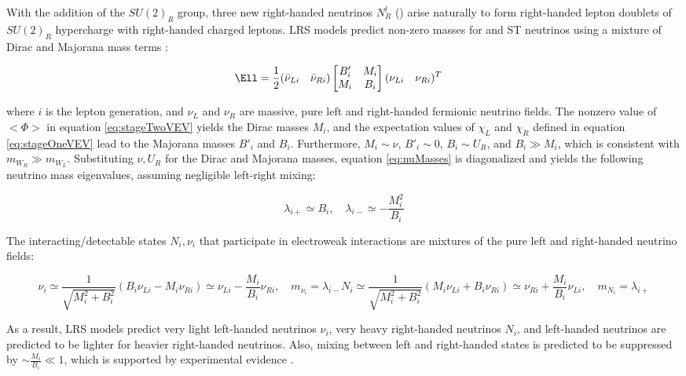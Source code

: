 With the addition of the $SU(2)_{R}$ group, three new right-handed neutrinos $N^{l}_{R}$ (\nul) arise naturally 
to form right-handed lepton doublets of $SU(2)_{R}$ hypercharge with right-handed charged leptons.  LRS models 
predict non-zero masses for \nul and ST neutrinos using a mixture of Dirac and Majorana mass terms \cite{seeSawAndParityViolation,seeSawAndGUTs}:

\begin{align}
	\Ell &= \frac{1}{2}(\bar{\nu}_{Li} \quad \bar{\nu}_{Ri})\begin{bmatrix}
	B'_{i} & M_{i} \\
	M_{i} & B_{i}
\end{bmatrix}(\nu_{Li} \quad \nu_{Ri})^{T}
\label{eq:nuMasses}
\end{align}

where $i$ is the lepton generation, and $\nu_{L}$ and $\nu_{R}$ are massive, pure left and right-handed 
fermionic neutrino fields.  The nonzero value of $<\Phi>$ in equation \ref{eq:stageTwoVEV} yields the 
Dirac masses $M_{i}$, and the expectation values of $\chi_{L}$ and $\chi_{R}$ defined in equation \ref{eq:stageOneVEV} 
lead to the Majorana masses $B'_{i}$ and $B_{i}$.  Furthermore, $M_{i} \sim \nu$, $B'_{i} \sim 0$, 
$B_{i} \sim U_{R}$, and $B_{i} \gg M_{i}$, which is consistent with $m_{W_{R}} \gg m_{W_{L}}$.  Substituting 
$\nu,U_{R}$ for the Dirac and Majorana masses, equation \ref{eq:nuMasses} is diagonalized and yields 
the following neutrino mass eigenvalues, assuming negligible left-right mixing:

\begin{equation}
	\lambda_{i+} \simeq B_{i},  \quad \lambda_{i-} \simeq -\frac{M^{2}_{i}}{B_{i}}
\end{equation}

The interacting/detectable states $N_{i}, \nu_{i}$ that participate in electroweak interactions are 
mixtures of the pure left and right-handed neutrino fields:

\begin{equation}
	\nu_{i} \simeq \frac{1}{\sqrt{M^{2}_{i} + B^{2}_{i}}}(B_{i}\nu_{Li} - M_{i}\nu_{Ri}) \simeq \nu_{Li} - \frac{M_{i}}{B_{i}}\nu_{Ri} , \quad m_{\nu_{i}} = \lambda_{i-}
	
	N_{i} \simeq \frac{1}{\sqrt{M^{2}_{i} + B^{2}_{i}}}(M_{i}\nu_{Li} + B_{i}\nu_{Ri}) \simeq \nu_{Ri} + \frac{M_{i}}{B_{i}}\nu_{Li} , \quad m_{N_{i}} = \lambda_{i+}
\end{equation}

As a result, LRS models predict very light left-handed neutrinos $\nu_{i}$, very heavy right-handed neutrinos 
$N_{i}$, and left-handed neutrinos are predicted to be lighter for heavier right-handed neutrinos.  Also, mixing 
between left and right-handed states is predicted to be suppressed by $\sim \frac{M_{i}}{B_{i}} \ll 1$, which 
is supported by experimental evidence \cite{dZeroMixingLimits,theoreticalMixingLimits}.


